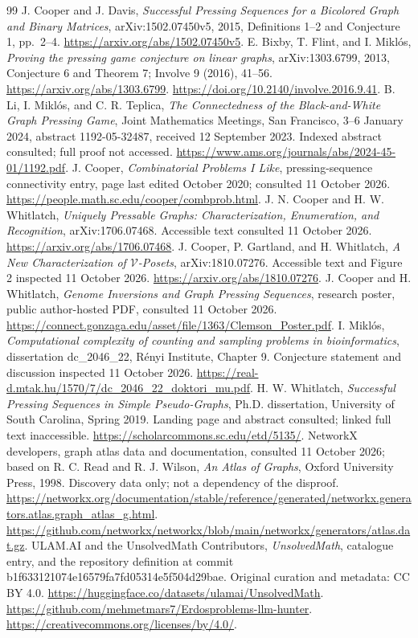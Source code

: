 \documentclass[11pt]{article}
\begin{document}
\begin{thebibliography}{99}
 J. Cooper and J. Davis,
\emph{Successful Pressing Sequences for a Bicolored Graph and Binary Matrices},
arXiv:1502.07450v5, 2015, Definitions 1--2 and Conjecture 1, pp.~2--4.
\url{https://arxiv.org/abs/1502.07450v5}.
 E. Bixby, T. Flint, and I. Mikl\'os,
\emph{Proving the pressing game conjecture on linear graphs},
arXiv:1303.6799, 2013, Conjecture 6 and Theorem 7;
Involve 9 (2016), 41--56.
\url{https://arxiv.org/abs/1303.6799}.
\url{https://doi.org/10.2140/involve.2016.9.41}.
 B. Li, I. Mikl\'os, and C. R. Teplica,
\emph{The Connectedness of the Black-and-White Graph Pressing Game},
Joint Mathematics Meetings, San Francisco, 3--6 January 2024,
abstract 1192-05-32487, received 12 September 2023.
Indexed abstract consulted; full proof not accessed.
\url{https://www.ams.org/journals/abs/2024-45-01/1192.pdf}.
 J. Cooper, \emph{Combinatorial Problems I Like},
pressing-sequence connectivity entry, page last edited October 2020;
consulted 11 October 2026.
\url{https://people.math.sc.edu/cooper/combprob.html}.
 J. N. Cooper and H. W. Whitlatch,
\emph{Uniquely Pressable Graphs: Characterization, Enumeration, and Recognition},
arXiv:1706.07468. Accessible text consulted 11 October 2026.
\url{https://arxiv.org/abs/1706.07468}.
 J. Cooper, P. Gartland, and H. Whitlatch,
\emph{A New Characterization of $\mathcal V$-Posets},
arXiv:1810.07276. Accessible text and Figure 2 inspected 11 October 2026.
\url{https://arxiv.org/abs/1810.07276}.
 J. Cooper and H. Whitlatch,
\emph{Genome Inversions and Graph Pressing Sequences}, research poster,
public author-hosted PDF, consulted 11 October 2026.
\url{https://connect.gonzaga.edu/asset/file/1363/Clemson_Poster.pdf}.
 I. Mikl\'os,
\emph{Computational complexity of counting and sampling problems in bioinformatics},
dissertation dc\_2046\_22, R\'enyi Institute, Chapter 9.
Conjecture statement and discussion inspected 11 October 2026.
\url{https://real-d.mtak.hu/1570/7/dc_2046_22_doktori_mu.pdf}.
 H. W. Whitlatch,
\emph{Successful Pressing Sequences in Simple Pseudo-Graphs},
Ph.D. dissertation, University of South Carolina, Spring 2019.
Landing page and abstract consulted; linked full text inaccessible.
\url{https://scholarcommons.sc.edu/etd/5135/}.
 NetworkX developers, graph atlas data and documentation,
consulted 11 October 2026; based on R. C. Read and R. J. Wilson,
\emph{An Atlas of Graphs}, Oxford University Press, 1998.
Discovery data only; not a dependency of the disproof.
\url{https://networkx.org/documentation/stable/reference/generated/networkx.generators.atlas.graph_atlas_g.html}.
\url{https://github.com/networkx/networkx/blob/main/networkx/generators/atlas.dat.gz}.
 ULAM.AI and the UnsolvedMath Contributors,
\emph{UnsolvedMath}, catalogue entry, and the repository
definition at commit b1f633121074e16579fa7fd05314e5f504d29bae.
Original curation and metadata: CC BY 4.0.
\url{https://huggingface.co/datasets/ulamai/UnsolvedMath}.
\url{https://github.com/mehmetmars7/Erdosproblems-llm-hunter}.
\url{https://creativecommons.org/licenses/by/4.0/}.
\end{thebibliography}
\end{document}
